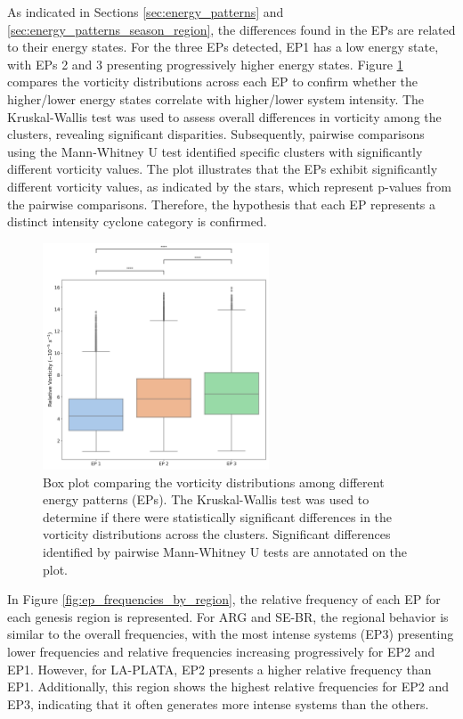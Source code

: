 As indicated in Sections \ref{sec:energy_patterns} and \ref{sec:energy_patterns_season_region}, the differences found in the EPs are related to their energy states. For the three EPs detected, EP1 has a low energy state, with EPs 2 and 3 presenting progressively higher energy states. Figure \ref{fig:boxplot_vorticity_by_cluster} compares the vorticity distributions across each EP to confirm whether the higher/lower energy states correlate with higher/lower system intensity. The Kruskal-Wallis test was used to assess overall differences in vorticity among the clusters, revealing significant disparities. Subsequently, pairwise comparisons using the Mann-Whitney U test identified specific clusters with significantly different vorticity values. The plot illustrates that the EPs exhibit significantly different vorticity values, as indicated by the stars, which represent p-values from the pairwise comparisons. Therefore, the hypothesis that each EP represents a distinct intensity cyclone category is confirmed.

\begin{figure}[!htbp]
    \centering
    \includegraphics[width=0.6\textwidth]{figs_6/boxplot_vorticity_by_cluster.png}
    \caption[Energy Patterns - Mean Intensity]{Box plot comparing the vorticity distributions among different energy patterns (EPs). The Kruskal-Wallis test was used to determine if there were statistically significant differences in the vorticity distributions across the clusters. Significant differences identified by pairwise Mann-Whitney U tests are annotated on the plot.}
    \label{fig:boxplot_vorticity_by_cluster}
\end{figure}

In Figure \ref{fig:ep_frequencies_by_region}, the relative frequency of each EP for each genesis region is represented. For ARG and SE-BR, the regional behavior is similar to the overall frequencies, with the most intense systems (EP3) presenting lower frequencies and relative frequencies increasing progressively for EP2 and EP1. However, for LA-PLATA, EP2 presents a higher relative frequency than EP1. Additionally, this region shows the highest relative frequencies for EP2 and EP3, indicating that it often generates more intense systems than the others. 

